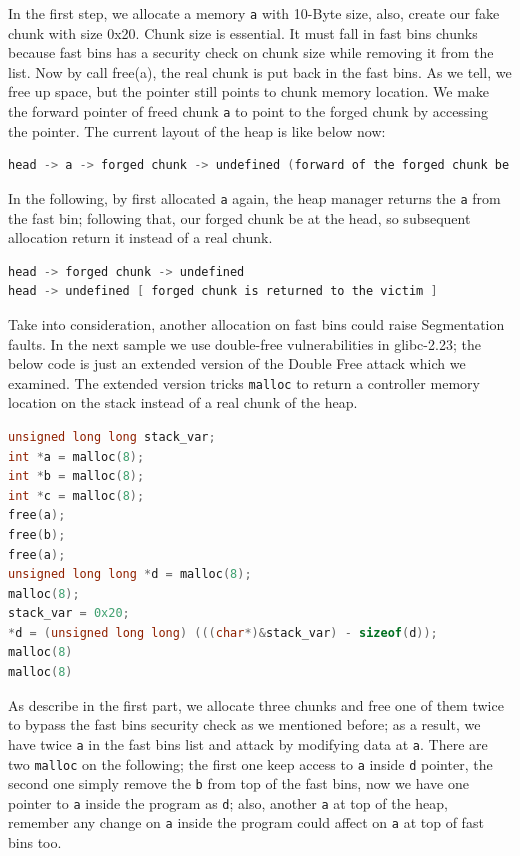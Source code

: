 \documentclass{masterthesis}
\newcommand*\libc{glibc}
\newcommand*\fb{fast bins}
\newcommand*\mallocc{\lstinline{malloc}}
\begin{document}
In the first step, we allocate a memory \lstinline{a} with 10-Byte size, also, create our fake chunk with size 0x20. Chunk size is essential. It must fall in \fb{} chunks because \fb{} has a security check on chunk size while removing it from the list.
Now by call free(a), the real chunk is put back in the \fb{}. As we tell, we free up space, but the pointer still points to chunk memory location. We make the forward pointer of freed chunk \lstinline{a} to point to the forged chunk by accessing the pointer. The current layout of the heap is like below now:

\begin{lstlisting}[language=c,frame=tlrb]
head -> a -> forged chunk -> undefined (forward of the forged chunk be holding attacker's data)
\end{lstlisting}

In the following, by first allocated \lstinline{a} again, the heap manager returns the \lstinline{a} from the fast bin; following that, our forged chunk be at the head, so subsequent allocation return it instead of a real chunk.

\begin{lstlisting}[language=c,frame=tlrb]
head -> forged chunk -> undefined
head -> undefined [ forged chunk is returned to the victim ]
\end{lstlisting}

Take into consideration, another allocation on \fb{} could raise Segmentation faults.
In the next sample we use double-free vulnerabilities in \libc{-2.23}; the below code is just an extended version of the Double Free attack which we examined. The extended version tricks \mallocc{} to return a controller memory location on the stack instead of a real chunk of the heap.

\begin{lstlisting}[language=c,frame=tlrb]
unsigned long long stack_var;
int *a = malloc(8);
int *b = malloc(8);
int *c = malloc(8);
free(a);
free(b);
free(a);
unsigned long long *d = malloc(8);
malloc(8);
stack_var = 0x20;
*d = (unsigned long long) (((char*)&stack_var) - sizeof(d));
malloc(8)
malloc(8)
\end{lstlisting}

As describe in the first part, we allocate three chunks and free one of them twice to bypass the \fb{} security check as we mentioned before; as a result, we have twice \lstinline{a} in the \fb{} list and attack by modifying data at \lstinline{a}. There are two \mallocc{} on the following; the first one keep access to \lstinline{a} inside \lstinline{d} pointer, the second one simply remove the \lstinline{b} from top of the \fb{}, now we have one pointer to \lstinline{a} inside the program as \lstinline{d}; also, another \lstinline{a} at top of the heap, remember any change on \lstinline{a} inside the program could affect on \lstinline{a} at top of \fb{} too.
\end{document}

